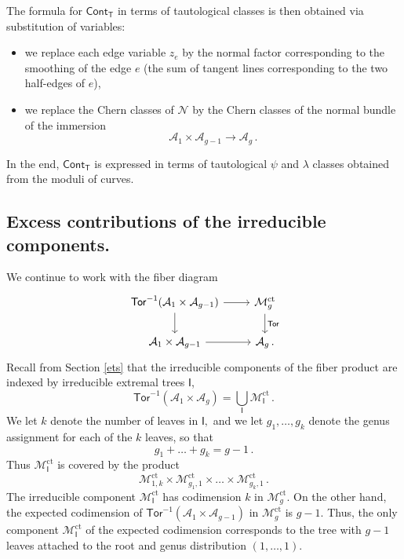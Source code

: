 \documentclass[11pt]{amsart}
\theoremstyle{definition}
\newcommand{\M}{\mathcal{M}}
\newcommand{\A}{\mathcal{A}}
\DeclareMathOperator{\ct}{ct}
\newcommand{\Tor}{\mathsf{Tor}}
\begin{document}
{The formula for
$\mathsf{Cont}_{\mathsf T}$
in terms of tautological classes is then obtained via substitution of
variables:
\begin{itemize}
    \item[$\bullet$] we
replace each edge variable $z_e$ by the
normal factor corresponding
to the smoothing of the edge $e$ (the sum of tangent
lines corresponding to the
two half-edges of $e$),
 \item[$\bullet$] we replace 
the Chern classes of $\mathcal{N}$
by the Chern classes of the normal bundle of the 
immersion
$$\A_1\times \A_{g-1}\to \A_g\, .$$
\end{itemize}
In the end, $\mathsf{Cont}_{\mathsf T}$ is expressed in terms
of tautological $\psi$ and $\lambda$ classes obtained from the
moduli of curves.


\subsection{Excess contributions of the irreducible components.} We continue to work with the fiber diagram 
\[
\begin{tikzcd}
\Tor^{-1}(\A_1\times \A_{g-1}) \arrow[d] \arrow[r] & \M_{g}^{\ct} \arrow[d, "\Tor"] \\
\A_1\times \A_{g-1} \arrow[r]       & \A_g \, .                       
\end{tikzcd}
\]
Recall from Section \ref{ets} that the irreducible components of the fiber product are indexed by irreducible extremal trees $\mathsf{I}$, 
$$\Tor^{-1}(\A_1\times \A_g)=\bigcup_{\mathsf I} \M_{\mathsf I}^{\ct}\,.$$ We let $k$ denote the number of leaves in $\mathsf{I},$ and we let $g_1, \ldots, g_k$ denote the genus assignment for each of the $k$ leaves, so that $$g_1+\ldots+g_k=g-1\,.$$ Thus 
$\M_{\mathsf I}^{\ct}$ is covered by the product $$\M_{1, k}^{\ct}\times \M_{g_1, 1}^{\ct} \times \ldots \times \M_{g_k, 1}^{\ct}\,.$$  
The irreducible component $\M_{\mathsf{I}}^{\ct}$ has codimension $k$ in $\M_g^{\ct}.$ On the other hand, the expected codimension of $\Tor^{-1}(\A_1\times \A_{g-1})$ in $\M_g^{\ct}$ is $g-1$. Thus, the only component $\M_{\mathsf I}^{\ct}$ of the expected codimension corresponds to the tree with $g-1$ leaves attached to the root and genus distribution $(1, \ldots, 1)$.   

}
\end{document}
